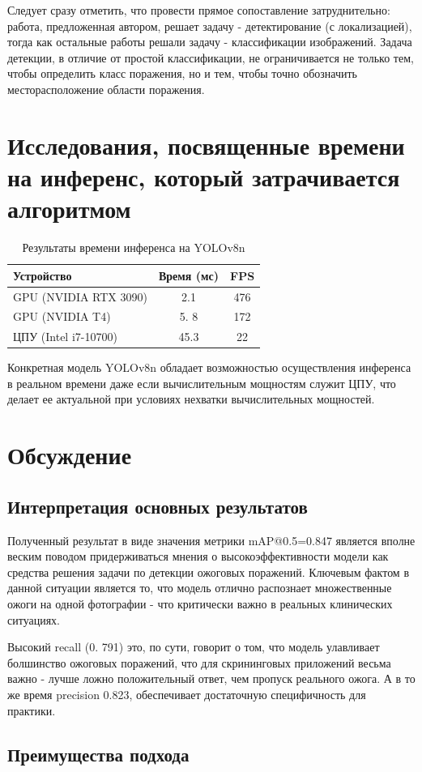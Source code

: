 Следует сразу отметить, что провести прямое сопоставление затруднительно: работа, предложенная автором, решает задачу - детектирование (с локализацией), тогда как остальные работы решали задачу - классификации изображений. Задача детекции, в отличие от простой классификации, не ограничивается не только тем, чтобы определить класс поражения, но и тем, чтобы точно обозначить месторасположение области поражения.

\section{Исследования, посвященные времени на инференс, который затрачивается алгоритмом}

\begin{table}[H]
\centering
\caption{Результаты времени инференса на YOLOv8n}
\label{tab:speed}
\begin{tabular}{lcc}
\toprule
\textbf{Устройство} & \textbf{Время (мс)} & \textbf{FPS} \\
\midrule
GPU (NVIDIA RTX 3090) & 2.1 & 476 \\
GPU (NVIDIA T4) & 5. 8 & 172 \\
ЦПУ (Intel i7-10700) & 45.3 & 22 \\
\bottomrule
\end{tabular}
\end{table}
Конкретная модель YOLOv8n обладает возможностью осуществления инференса в реальном времени даже если вычислительным мощностям служит ЦПУ, что делает ее актуальной при условиях нехватки вычислительных мощностей. \section{Обсуждение}

\subsection{Интерпретация основных результатов}

Полученный результат в виде значения метрики mAP@0.5=0.847 является вполне веским поводом придерживаться мнения о высокоэффективности модели как средства решения задачи по детекции ожоговых поражений. Ключевым фактом в данной ситуации является то, что модель отлично распознает множественные ожоги на одной фотографии - что критически важно в реальных клинических ситуациях.

Высокий recall (0. 791) это, по сути, говорит о том, что модель улавливает болшинство ожоговых поражений, что для скрининговых приложений весьма важно - лучше ложно положительный ответ, чем пропуск реального ожога. А в то же время precision 0.823, обеспечивает достаточную специфичность для практики. \subsection{Преимущества подхода}

